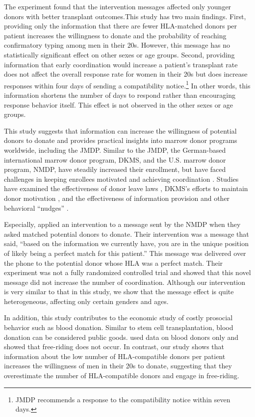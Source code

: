 \documentclass[12pt, a4paper]{article}
\begin{document}
The experiment found that the intervention messages affected only younger donors with better transplant outcomes.This study has two main findings. First, providing only the information that there are fewer HLA-matched donors per patient increases the willingness to donate and the probability of reaching confirmatory typing among men in their 20s. However, this message has no statistically significant effect on other sexes or age groups. Second, providing information that early coordination would increase a patient's transplant rate does not affect the overall response rate for women in their 20s but does increase responses within four days of sending a compatibility notice.\footnote{JMDP recommends a response to the compatibility notice within seven days.} In other words, this information shortens the number of days to respond rather than encouraging response behavior itself. This effect is not observed in the other sexes or age groups.

This study suggests that information can increase the willingness of potential donors to donate and provides practical insights into marrow donor programs worldwide, including the JMDP. Similar to the JMDP, the German-based international marrow donor program, DKMS, and the U.S. marrow donor program, NMDP, have steadily increased their enrollment, but have faced challenges in keeping enrollees motivated and achieving coordination \citep{Switzer1999, Switzer2004, Haylock2022}. Studies have examined the effectiveness of donor leave laws \citep{Lacetera2014}, DKMS's efforts to maintain donor motivation \citep{Haylock2022}, and the effectiveness of information provision and other behavioral ``nudges'' \citep{Grieco2018, Switzer2018}.

Especially, \citet{Switzer2018} applied an intervention to a message sent by the NMDP when they asked matched potential donors to donate. Their intervention was a message that said, ``based on the information we currently have, you are in the unique position of likely being a perfect match for this patient.'' This message was delivered over the phone to the potential donor whose HLA was a perfect match. Their experiment was not a fully randomized controlled trial and showed that this novel message did not increase the number of coordination. Although our intervention is very similar to that in this study, we show that the message effect is quite heterogeneous, affecting only certain genders and ages.

In addition, this study contributes to the economic study of costly prosocial behavior such as blood donation. Similar to stem cell transplantation, blood donation can be considered public goods. \citet{Wildman2009} used data on blood donors only and showed that free-riding does not occur. In contrast, our study shows that information about the low number of HLA-compatible donors per patient increases the willingness of men in their 20s to donate, suggesting that they overestimate the number of HLA-compatible donors and engage in free-riding.
\end{document}
